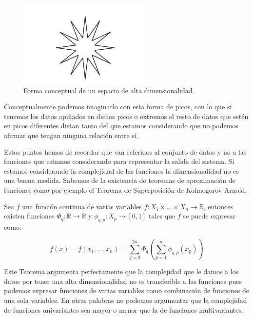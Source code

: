 \begin{enumerate}
	\begin{figure}[H]
		\centering
		\label{espacio_alta_dimension}
		\includegraphics[scale=0.6]{imagenes/espacio_alta_dimension}
		\caption{Forma conceptual de un espacio de alta dimensionalidad.\cite[p.~64]{cherkassky_learning_2007}}
	\end{figure}

	Conceptualmente podemos imaginarlo con esta forma de picos, con lo que si tenemos los datos apiñados en dichos picos o extremos el resto de datos que estén en picos diferentes distan tanto del que estamos considerando que no podemos afirmar que tengan ninguna relación entre sí.
\end{enumerate}

Estos puntos hemos de recordar que van referidos al conjunto de datos y no a las funciones que estamos considerando para representar la salida del sistema. Si estamos considerando la complejidad de las funciones la dimensionalidad no es una buena medida. Sabemos de la existencia de teoremas de aproximación de funciones como por ejemplo el Teorema de Superposición de Kolmogorov-Arnold.

\begin{teorema}
	Sea $f$ una función continua de varias variables $f:X_1 \times ... \times X_n \rightarrow \mathbb{R}$, entonces existen funciones $\Phi_q : \mathbb{R}\rightarrow \mathbb{R}$ y $\phi_{q,p} : X_p \rightarrow [0,1]$ tales que $f$ se puede expresar como:
	
	$$f(x) = f(x_1, ..., x_n) = \sum_{q=0}^{2n}\Phi_q ( \sum_{p=1}^{n}\phi_{q,p}(x_p))$$
\end{teorema}

Este Teorema argumenta perfectamente que la complejidad que le damos a los datos por tener una alta dimensionalidad no es transferible a las funciones pues podemos expresar funciones de varias variables como combinación de funciones de una sola variables. En otras palabras no podemos argumentar que la complejidad de funciones univariantes sea mayor o menor que la de funciones multivariantes.

